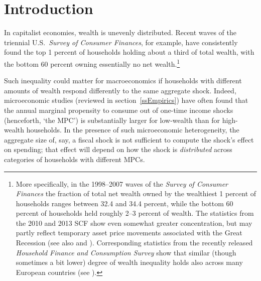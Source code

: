 \documentclass[12pt,titlepage]{econtex}
\newlength{\defbaselineskip}
\newcommand{\oneandhalfspacing}{\setlength{\baselineskip}{1.5 \defbaselineskip}}
\begin{document}
\thispagestyle{empty}


\titlepagefinish

\pagebreak\newpage

\section{Introduction}\label{sec:Intro}

In capitalist economies, wealth is unevenly distributed.  Recent waves of
the triennial U.S.\ {\it Survey of Consumer Finances}, for example, have
consistently found the top 1 percent of households holding about a
third of total wealth, with the bottom 60 percent owning essentially no net wealth.\footnote{%
More specifically, in the 1998--2007 waves of the \emph{Survey of Consumer Finances}
  the fraction of total net wealth owned by the wealthiest 1 percent of households ranges between 32.4 and 34.4 percent,
 while the bottom 60 percent of households held roughly 2--3 percent of wealth.
 The statistics from the 2010 and 2013 SCF show even somewhat greater concentration, but may partly reflect temporary asset
price movements associated with the Great Recession (see also \cite{brickerEtAl:topWealth} and \cite{szWIneq}). Corresponding statistics from the recently released
\emph{Household Finance and Consumption Survey} show that similar (though sometimes a bit lower) degree of wealth inequality holds also across many European countries (see \cite{cstMPCxc}).}


Such inequality could matter for macroeconomics if households with
different amounts of wealth respond differently to the same aggregate
shock.  Indeed, microeconomic studies (reviewed in section~\ref{ssEmpirics}) have often found that the annual
marginal propensity to consume out of one-time income shocks
(henceforth, `the MPC') is substantially larger for low-wealth than for high-wealth
households.  In the presence of such microeconomic heterogeneity, the
aggregate size of, say, a fiscal shock is not sufficient to compute
the shock's effect on spending; that effect will depend on how the
shock is {\it distributed} across categories of households with different
MPCs.
\end{document}
